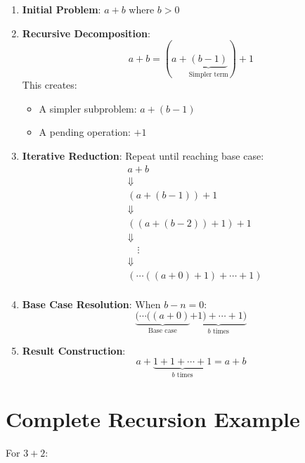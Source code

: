 \documentclass{article}
\begin{document}
\begin{enumerate}
    \item \textbf{Initial Problem}: \(a + b\) where \(b > 0\)

    \item \textbf{Recursive Decomposition}:
          \[
              a + b = (a + \underbrace{(b - 1)}_{\text{Simpler term}}) + 1
          \]
          This creates:
          \begin{itemize}
              \item A simpler subproblem: \(a + (b - 1)\)
              \item A pending operation: \(+ 1\)
          \end{itemize}

    \item \textbf{Iterative Reduction}:
          Repeat until reaching base case:
          \[
              \begin{aligned}
                   & a + b                              \\
                   & \Downarrow                         \\
                   & (a + (b-1)) + 1                    \\
                   & \Downarrow                         \\
                   & ((a + (b-2)) + 1) + 1              \\
                   & \Downarrow                         \\
                   & \quad \vdots                       \\
                   & \Downarrow                         \\
                   & (\cdots((a + 0) + 1) + \cdots + 1) \\
              \end{aligned}
          \]

    \item \textbf{Base Case Resolution}:
          When \(b - n = 0\):
          \[
              \underbrace{(\cdots((a + 0)}_{\text{Base case}} \underbrace{+ 1) + \cdots + 1)}_{b \text{ times}}
          \]

    \item \textbf{Result Construction}:
          \[
              a + \underbrace{1 + 1 + \cdots + 1}_{b \text{ times}} = a + b
          \]
\end{enumerate}

\section{Complete Recursion Example}
For \(3 + 2\):
\end{document}
